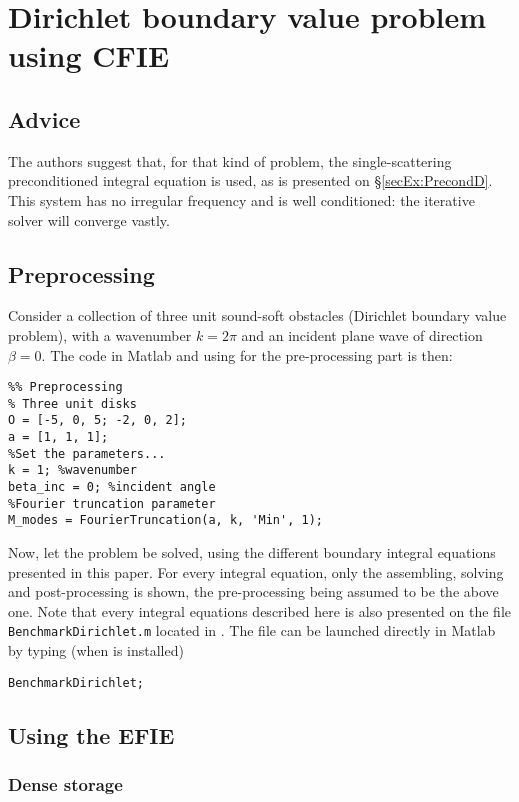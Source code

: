 
\section{Dirichlet boundary value problem using CFIE}

\subsection{Advice}

The authors suggest that, for that kind of problem, the single-scattering preconditioned integral equation is used, as is presented on \S\ref{secEx:PrecondD}. This system has no irregular frequency and is well conditioned: the iterative solver will converge vastly.

\subsection{Preprocessing}

Consider a collection of three unit sound-soft obstacles (Dirichlet boundary value problem), with a wavenumber $k=2\pi$ and an incident plane wave of direction $\beta = 0$. The code in Matlab and using \mudiff for the pre-processing part is then:
\begin{lstlisting}
%% Preprocessing
% Three unit disks 
O = [-5, 0, 5; -2, 0, 2];
a = [1, 1, 1];
%Set the parameters...
k = 1; %wavenumber
beta_inc = 0; %incident angle
%Fourier truncation parameter
M_modes = FourierTruncation(a, k, 'Min', 1);
\end{lstlisting}

Now, let the problem be solved, using the different boundary integral equations presented in this paper. For every integral equation, only the assembling, solving and post-processing is shown, the pre-processing being assumed to be the above one. Note that every integral equations described here is also presented on the file \texttt{BenchmarkDirichlet.m} located in . The file can be launched directly in Matlab by typing (when \mudiff is installed)
\begin{lstlisting}
BenchmarkDirichlet;
\end{lstlisting}

\subsection{Using the EFIE}

\subsubsection{Dense storage}

